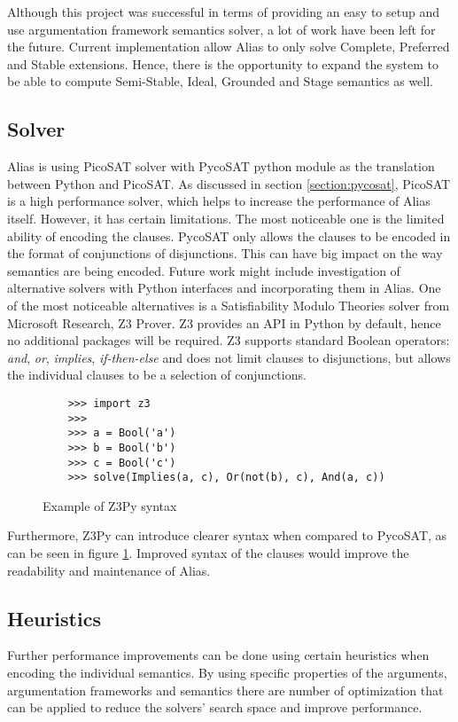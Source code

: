 Although this project was successful in terms of providing an easy to setup and use argumentation framework semantics solver, a lot of work have been left for the future. Current implementation allow Alias to only solve Complete, Preferred and Stable extensions. Hence, there is the opportunity to expand the system to be able to compute Semi-Stable, Ideal, Grounded and Stage semantics as well. 

\subsection{Solver}

Alias is using PicoSAT solver with PycoSAT python module as the translation between Python and PicoSAT. As discussed in section \ref{section:pycosat}, PicoSAT is a high performance solver, which helps to increase the performance of Alias itself. However, it has certain limitations. The most noticeable one is the limited ability of encoding the clauses. PycoSAT only allows the clauses to be encoded in the format of conjunctions of disjunctions. This can have big impact on the way semantics are being encoded. Future work might include investigation of alternative solvers with Python interfaces and incorporating them in Alias. One of the most noticeable alternatives is a Satisfiability Modulo Theories solver from Microsoft Research, Z3 Prover. Z3 provides an API in Python by default, hence no additional packages will be required. Z3 supports standard Boolean operators: \textit{and}, \textit{or}, \textit{implies}, \textit{if-then-else} and does not limit clauses to disjunctions, but allows the individual clauses to be a selection of conjunctions. 

\begin{figure}
	\begin{verbatim}
	>>> import z3
	>>>
	>>> a = Bool('a')
	>>> b = Bool('b')
	>>> c = Bool('c')
	>>> solve(Implies(a, c), Or(not(b), c), And(a, c))
	\end{verbatim}
	\caption{Example of Z3Py syntax}
	\label{fig:z3}
\end{figure}

Furthermore, Z3Py can introduce clearer syntax when compared to PycoSAT, as can be seen in figure \ref{fig:z3}. Improved syntax of the clauses would improve the readability and maintenance of Alias. 

\subsection{Heuristics}
Further performance improvements can be done using certain heuristics when encoding the individual semantics. By using specific properties of the arguments, argumentation frameworks and semantics there are number of optimization that can be applied to reduce the solvers' search space and improve performance.

